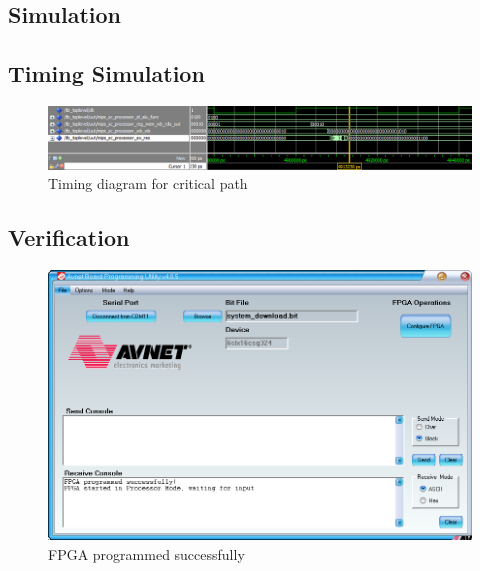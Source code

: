 \subsection{Simulation}

\subsection{Timing Simulation}

\begin{figure}[ht]
    \centering
    \includegraphics[scale=0.5]{figures/TimingSimulation.png}
    \caption{Timing diagram for critical path} 
    \label{fig:timing}
\end{figure}

\subsection{Verification}

\begin{figure}[ht]
    \centering
    \includegraphics[scale=0.5]{figures/AVNET.png}
    \caption{FPGA programmed successfully} 
    \label{fig:avprog}
\end{figure}

